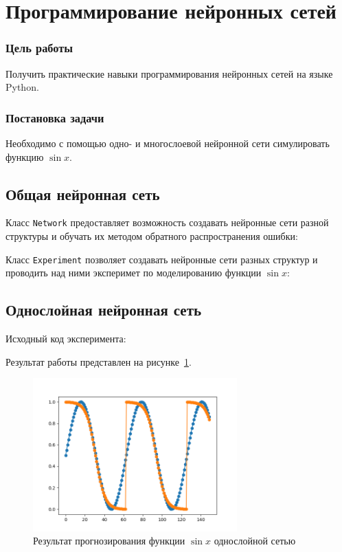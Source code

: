 



\newcommand{\labnumber}{2} %



\graphicspath{{figures/}}


\Russian


\addtocounter{page}{1}

\section*{Программирование нейронных сетей}
\subsubsection*{Цель работы}
Получить практические навыки программирования нейронных сетей на языке Python.
\subsubsection*{Постановка задачи}
Необходимо с помощью одно- и многослоевой нейронной сети симулировать функцию $\sin x$.

\subsection*{Общая нейронная сеть}
Класс \texttt{Network} предоставляет возможность создавать нейронные сети разной структуры и обучать их методом обратного распространения ошибки: 
 

Класс \texttt{Experiment} позволяет создавать нейронные сети разных структур и проводить над ними эксперимет по моделированию функции $\sin x$:
 


\subsection*{Однослойная нейронная сеть}
Исходный код эксперимента:  
 

Результат работы представлен на рисунке~\ref{fig:single_layer_result}.

\begin{figure}[H]
    \centering
        \includegraphics[width=0.7\textwidth]{single_layer_result}
    \caption{Результат прогнозирования функции $\sin x$ однослойной сетью}
    \label{fig:single_layer_result}
\end{figure}

